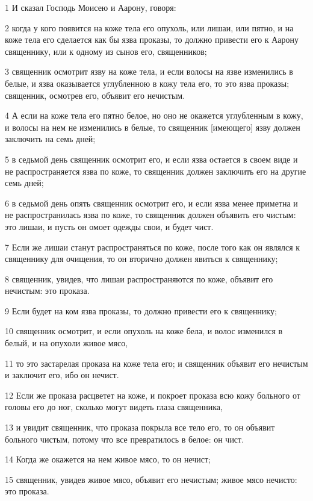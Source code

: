 \par 1 И сказал Господь Моисею и Аарону, говоря:
\par 2 когда у кого появится на коже тела его опухоль, или лишаи, или пятно, и на коже тела его сделается как бы язва проказы, то должно привести его к Аарону священнику, или к одному из сынов его, священников;
\par 3 священник осмотрит язву на коже тела, и если волосы на язве изменились в белые, и язва оказывается углубленною в кожу тела его, то это язва проказы; священник, осмотрев его, объявит его нечистым.
\par 4 А если на коже тела его пятно белое, но оно не окажется углубленным в кожу, и волосы на нем не изменились в белые, то священник [имеющего] язву должен заключить на семь дней;
\par 5 в седьмой день священник осмотрит его, и если язва остается в своем виде и не распространяется язва по коже, то священник должен заключить его на другие семь дней;
\par 6 в седьмой день опять священник осмотрит его, и если язва менее приметна и не распространилась язва по коже, то священник должен объявить его чистым: это лишаи, и пусть он омоет одежды свои, и будет чист.
\par 7 Если же лишаи станут распространяться по коже, после того как он являлся к священнику для очищения, то он вторично должен явиться к священнику;
\par 8 священник, увидев, что лишаи распространяются по коже, объявит его нечистым: это проказа.
\par 9 Если будет на ком язва проказы, то должно привести его к священнику;
\par 10 священник осмотрит, и если опухоль на коже бела, и волос изменился в белый, и на опухоли живое мясо,
\par 11 то это застарелая проказа на коже тела его; и священник объявит его нечистым и заключит его, ибо он нечист.
\par 12 Если же проказа расцветет на коже, и покроет проказа всю кожу больного от головы его до ног, сколько могут видеть глаза священника,
\par 13 и увидит священник, что проказа покрыла все тело его, то он объявит больного чистым, потому что все превратилось в белое: он чист.
\par 14 Когда же окажется на нем живое мясо, то он нечист;
\par 15 священник, увидев живое мясо, объявит его нечистым; живое мясо нечисто: это проказа.
